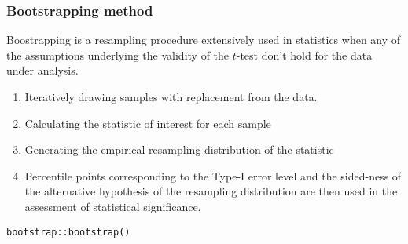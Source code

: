 \documentclass[table,10pt]{beamer}\usepackage[]{graphicx}\usepackage[]{color}
\makeatletter
\newcommand{\hlnum}[1]{\textcolor[rgb]{0.686,0.059,0.569}{#1}}%
\newcommand{\hlcom}[1]{\textcolor[rgb]{0.678,0.584,0.686}{\textit{#1}}}%
\newcommand{\hlopt}[1]{\textcolor[rgb]{0,0,0}{#1}}%
\newcommand{\hlstd}[1]{\textcolor[rgb]{0.345,0.345,0.345}{#1}}%
\newcommand{\hlkwa}[1]{\textcolor[rgb]{0.161,0.373,0.58}{\textbf{#1}}}%
\newcommand{\hlkwb}[1]{\textcolor[rgb]{0.69,0.353,0.396}{#1}}%
\newcommand{\hlkwc}[1]{\textcolor[rgb]{0.333,0.667,0.333}{#1}}%
\newcommand{\hlkwd}[1]{\textcolor[rgb]{0.737,0.353,0.396}{\textbf{#1}}}%
\newenvironment{kframe}{%
 \def\at@end@of@kframe{}%
 \ifinner\ifhmode%
  \def\at@end@of@kframe{\end{minipage}}%
  \begin{minipage}{\columnwidth}%
 \fi\fi%
 \def\FrameCommand##1{\hskip\@totalleftmargin \hskip-\fboxsep
 \colorbox{shadecolor}{##1}\hskip-\fboxsep
     \hskip-\linewidth \hskip-\@totalleftmargin \hskip\columnwidth}%
 \MakeFramed {\advance\hsize-\width
   \@totalleftmargin\z@ \linewidth\hsize
   \@setminipage}}%
 {\par\unskip\endMakeFramed%
 \at@end@of@kframe}
\newenvironment{knitrout}{}{} %
\makeatother
\begin{document}
\begin{CJK*}{UTF8}{gbsn}
\begin{frame}[t,containsverbatim]
\frametitle{Bootstrapping method}
Boostrapping is a resampling procedure extensively used in statistics 
when any of the assumptions underlying the validity of the $t$-test 
don't hold for the data under analysis.
\begin{enumerate}
	\item Iteratively drawing samples with replacement from 
		the data.
	\item Calculating the statistic of interest for each sample
	\item Generating the empirical resampling distribution of 
		the statistic
	\item Percentile points corresponding to the Type-I error level 
		and the sided-ness of the alternative hypothesis of the 
		resampling distribution are then used in the assessment 
		of statistical significance.
\end{enumerate}
\begin{lstlisting}
bootstrap::bootstrap()
\end{lstlisting}
\end{frame}


\end{CJK*}
\end{document}
